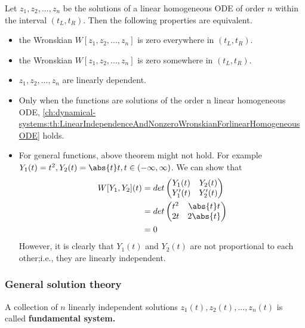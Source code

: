 \begin{refsection}
\begin{corollary}Let $z_1,z_2,...,z_n$ be the solutions of a linear homogeneous ODE of order $n$ within the interval $(t_L,t_R)$. Then the following properties are equivalent.
	\begin{itemize}
		\item the Wronskian $W[z_1,z_2,...,z_n]$ is zero everywhere in $(t_L,t_R)$.
		\item the Wronskian $W[z_1,z_2,...,z_n]$ is zero somewhere in $(t_L,t_R)$.
		\item $z_1,z_2,...,z_n$ are linearly dependent.
	\end{itemize}	
\end{corollary}

\begin{remark}
\begin{itemize}
	\item Only when the functions are solutions of the order n linear homogeneous ODE, \autoref{ch:dynamical-systems:th:LinearIndependenceAndNonzeroWronskianForlinearHomogeneousODE} holds.
	\item For general functions, above theorem might not hold. For example $Y_1(t) = t^2,Y_2(t) = \abs{t}t, t\in(-\infty,\infty)$. We can show that
	\begin{align*}
	W[Y_1,Y_2](t) &= det \begin{pmatrix}
	Y_1(t) & Y_2(t) \\
	Y_1'(t) & Y_2'(t)
	\end{pmatrix} \\
	&= det \begin{pmatrix}
	t^2 & \abs{t}t \\
	2t & 2\abs{t}
	\end{pmatrix} \\
	&= 0
	\end{align*}
	However, it is clearly that $Y_1(t)$ and $Y_2(t)$ are not proportional to each other;i.e., they are linearly independent.
\end{itemize}	
\end{remark}


\subsubsection{General solution theory}


\begin{definition}
	\cite[30]{sanchez1968ordinary} A collection of $n$ linearly independent solutions $z_1(t),z_2(t),...,z_n(t)$ is called \textbf{fundamental system.} 
\end{definition}


\end{refsection}
